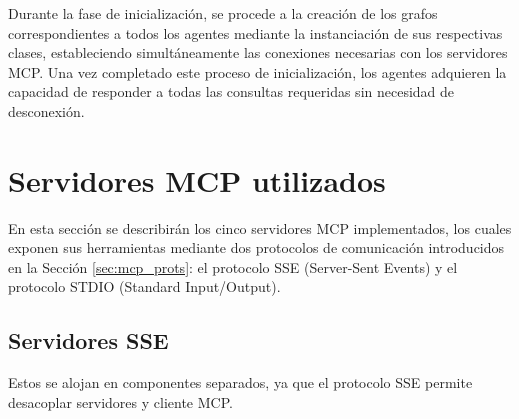 Durante la fase de inicialización, se procede a la creación de los grafos correspondientes a todos los agentes mediante la instanciación de sus respectivas clases, estableciendo simultáneamente las conexiones necesarias con los servidores MCP. Una vez completado este proceso de inicialización, los agentes adquieren la capacidad de responder a todas las consultas requeridas sin necesidad de desconexión. 

\section{Servidores MCP utilizados}
En esta sección se describirán los cinco servidores MCP implementados, los cuales exponen sus herramientas mediante dos protocolos de comunicación introducidos en la Sección \ref{sec:mcp_prots}: el protocolo SSE (Server-Sent Events) y el protocolo STDIO (Standard Input/Output).

\subsection{Servidores SSE}
Estos se alojan en componentes separados, ya que el protocolo SSE permite desacoplar servidores y cliente MCP.

